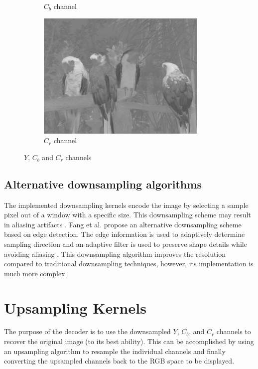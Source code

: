 \documentclass[10pt,twocolumn,letterpaper]{article}
\begin{document}
\begin{figure}
\begin{subfigure}[b]{0.2\textwidth}
        \caption{$C_b$ channel}
        \label{fig:Cb}
    \end{subfigure}
    \begin{subfigure}[b]{0.2\textwidth}
        \includegraphics[width=\textwidth]{Cr.jpg}
        \caption{$C_r$ channel}
        \label{fig:Cr}
    \end{subfigure}
       \caption{$Y$, $C_b$ and $C_r$ channels}
       \label{fig:YCbCr}
\end{figure}

\subsection{Alternative downsampling algorithms}
The implemented downsampling kernels encode the image by selecting a sample pixel out of a window with a specific size. This downsampling scheme may result in aliasing artifacts \cite{Article5}. Fang et al. propose an alternative downsampling scheme based on edge detection. The edge information is used to adaptively determine sampling direction and an adaptive filter is used to preserve shape details while avoiding aliasing \cite{Article5}. This downsampling algorithm improves the resolution compared to traditional downsampling techniques, however, its implementation is much more complex.  

\section{Upsampling Kernels}
The purpose of the decoder is to use the downsampled $Y$, $C_b$, and $C_r$ channels to recover the original image (to its best ability). This can be accomplished by using an upsampling algorithm to resample the individual channels and finally converting the upsampled channels back to the RGB space to be displayed. 
\end{document}
